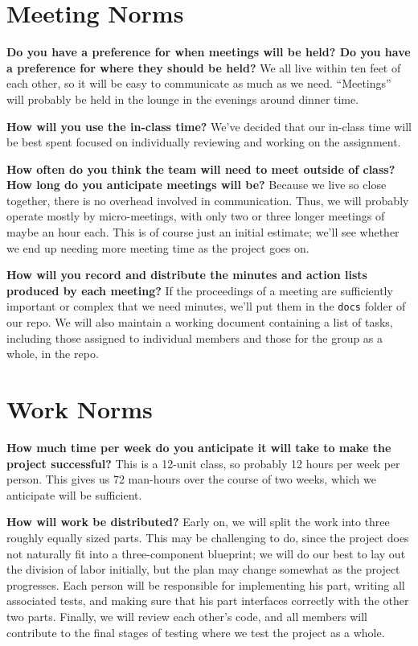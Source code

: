 \documentclass[11pt]{article}
\newcommand{\question}[2]{{\noindent\bf #1}\newline #2 \newline}
\begin{document}
\section{Meeting Norms}
\question{Do you have a preference for when meetings will be held? Do you have a preference for where they should be held?}{
We all live within ten feet of each other, so it will be easy to communicate as much as we need.  ``Meetings'' will probably be held in the lounge in the evenings around dinner time.}

\question{How will you use the in-class time?}{
We've decided that our in-class time will be best spent focused on individually reviewing and working on the assignment.}

\question{How often do you think the team will need to meet outside of class? How long do you anticipate meetings will be?}{
Because we live so close together, there is no overhead involved in communication.  Thus, we will probably operate mostly by micro-meetings, with only two or three longer meetings of maybe an hour each.  This is of course just an initial estimate; we'll see whether we end up needing more meeting time as the project goes on.}

\question{How will you record and distribute the minutes and action lists produced by each meeting?}{
If the proceedings of a meeting are sufficiently important or complex that we need minutes, we'll put them in the \texttt{docs} folder of our repo.  We will also maintain a working document containing a list of tasks, including those assigned to individual members and those for the group as a whole, in the repo.}

\section{Work Norms}
\question{How much time per week do you anticipate it will take to make the project successful?}{
This is a 12-unit class, so probably 12 hours per week per person.  This gives us 72 man-hours over the course of two weeks, which we anticipate will be sufficient.}

\question{How will work be distributed?}{
Early on, we will split the work into three roughly equally sized parts.  This may be challenging to do, since the project does not naturally fit into a three-component blueprint; we will do our best to lay out the division of labor initially, but the plan may change somewhat as the project progresses. Each person will be responsible for implementing his part, writing all associated tests, and making sure that his part interfaces correctly with the other two parts.  Finally, we will review each other's code, and all members will contribute to the final stages of testing where we test the project as a whole.}
\end{document}
